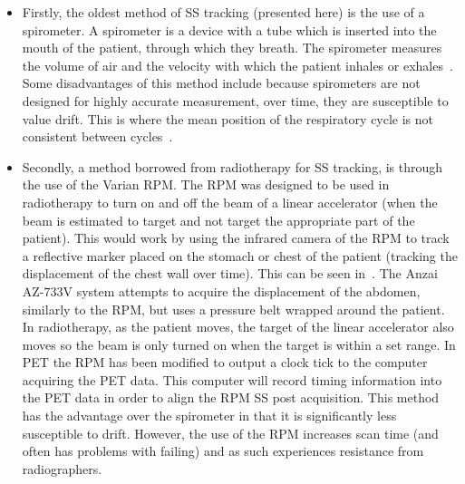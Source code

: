                \begin{itemize}
                    \item Firstly, the oldest method of \gls{SS} tracking (presented here) is the use of a spirometer. A spirometer is a device with a tube which is inserted into the mouth of the patient, through which they breath. The spirometer measures the volume of air and the velocity with which the patient inhales or exhales~\parencite{Guivarch2004SynchronizationPlethysmography}. Some disadvantages of this method include %
                    because spirometers are not designed for highly accurate measurement, over time, they are susceptible to value drift. This is where the mean position of the respiratory cycle is not consistent between cycles~\parencite{Hoisak2004}.
                    
                    \item Secondly, a method borrowed from radiotherapy for \gls{SS} tracking, is through the use of the Varian \gls{RPM}. The \gls{RPM} was designed to be used in radiotherapy to turn on and off the beam of a linear accelerator (when the beam is estimated to target and not target the appropriate part of the patient). This would work by using the infrared camera of the \gls{RPM} to track a reflective marker placed on the stomach or chest of the patient (tracking the displacement of the chest wall over time). This can be seen in~. The Anzai AZ-$733$V system attempts to acquire the displacement of the abdomen, similarly to the \gls{RPM}, but uses a pressure belt wrapped around the patient. In radiotherapy, as the patient moves, the target of the linear accelerator also moves so the beam is only turned on when the target is within a set range. In \gls{PET} the \gls{RPM} has been modified to output a clock tick to the computer acquiring the \gls{PET} data. This computer will %
                    record timing information into the \gls{PET} data in order to align the \gls{RPM} \gls{SS} post acquisition. This method has the advantage over the spirometer in that it is significantly less susceptible to drift. However, the use of the \gls{RPM} increases scan time (and often has problems with failing) and as such experiences resistance from radiographers.
                    

\end{itemize}
